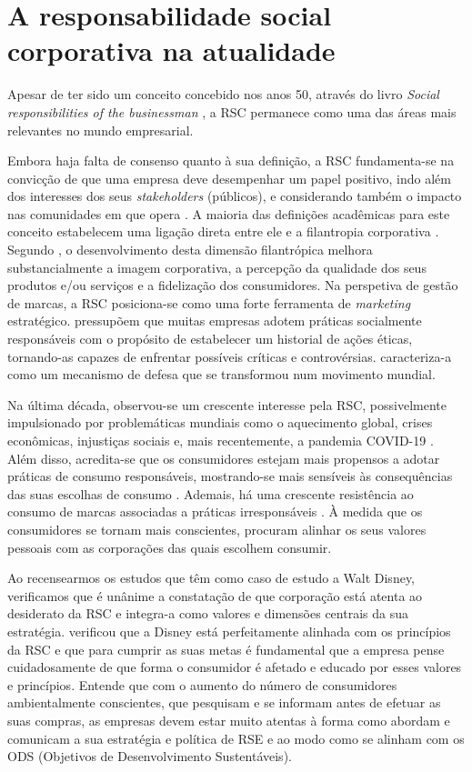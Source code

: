 \documentclass[portuguese]{textolivre}
\begin{document}
\section{A responsabilidade social corporativa na atualidade}\label{sec-normas}
Apesar de ter sido um conceito concebido nos anos 50, através do livro \textit{Social responsibilities of the businessman} \cite{bowen_social_1953}, a RSC permanece como uma das áreas mais relevantes no mundo empresarial. 

Embora haja falta de consenso quanto à sua definição, a RSC fundamenta-se na convicção de que uma empresa deve desempenhar um papel positivo, indo além dos interesses dos seus \textit{stakeholders} (públicos), e considerando também o impacto nas comunidades em que opera \cite{camilleri_corporate_2017,stobierski_what_2021}.  A maioria das definições acadêmicas para este conceito estabelecem uma ligação direta entre ele e a filantropia corporativa \cite{carroll_carrolls_2016}. Segundo \textcite[p.~494]{kotler_marketing_2022}, o desenvolvimento desta dimensão filantrópica melhora substancialmente a imagem corporativa, a percepção da qualidade dos seus produtos e/ou serviços e a fidelização dos consumidores.   
Na perspetiva de gestão de marcas, a RSC posiciona-se como uma forte ferramenta de \textit{marketing} estratégico. \textcite{kotler_marketing_2022} pressupõem que muitas empresas adotem práticas socialmente responsáveis com o propósito de estabelecer um historial de ações éticas, tornando-as capazes de enfrentar possíveis críticas e controvérsias. \textcite{kell_five_2014} caracteriza-a como um mecanismo de defesa que se transformou num movimento mundial. 

Na última década, observou-se um crescente interesse pela RSC, possivelmente impulsionado por problemáticas mundiais como o aquecimento global, crises econômicas, injustiças sociais e, mais recentemente, a pandemia COVID-19 \cite{quezado_corporate_2022}. Além disso, acredita-se que os consumidores estejam mais propensos a adotar práticas de consumo responsáveis, mostrando-se mais sensíveis às consequências das suas escolhas de consumo \cite{faria_um_2019,quezado_corporate_2022}. Ademais, há uma crescente resistência ao consumo de marcas associadas a práticas irresponsáveis \cite{aftab_impact_2014}. À medida que os consumidores se tornam mais conscientes, procuram alinhar os seus valores pessoais com as corporações das quais escolhem consumir. 

Ao recensearmos os estudos que têm como caso de estudo a Walt Disney, verificamos que é unânime a constatação de que corporação está atenta ao desiderato da RSC e integra-a como valores e dimensões centrais da sua estratégia. \textcite{luiten_corporate_2020} verificou que a Disney está perfeitamente alinhada com os princípios da RSC e que para cumprir as suas metas é fundamental que a empresa pense cuidadosamente de que forma o consumidor é afetado e educado por esses valores e princípios. Entende que com o aumento do número de consumidores ambientalmente conscientes, que pesquisam e se informam antes de efetuar as suas compras, as empresas devem estar muito atentas à forma como abordam e comunicam a sua estratégia e política de RSE e ao modo como se alinham com os ODS (Objetivos de Desenvolvimento Sustentáveis).
\end{document}
